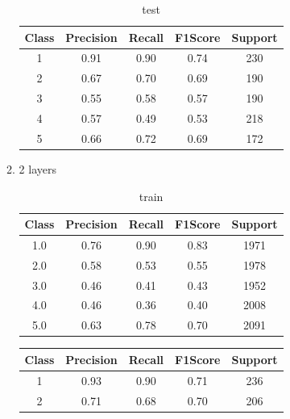 \begin{enumerate}[label=(\alph*)]
\begin{enumerate}[label=\roman*.]
\begin{table}[!htb]
            \label{part f train depth 1}
        \end{table}
        \begin{table}[!htb]
            \centering
            \begin{tabular}{ccccc}
            \hline
            Class & Precision & Recall & F1Score & Support \\ \hline
            1     & 0.91      & 0.90   & 0.74    & 230     \\
            2     & 0.67      & 0.70   & 0.69    & 190     \\
            3     & 0.55      & 0.58   & 0.57    & 190     \\
            4     & 0.57      & 0.49   & 0.53    & 218     \\
            5     & 0.66      & 0.72   & 0.69    & 172     \\ \hline
            \end{tabular}
            \caption{test}
            \label{part f test depth 1}
        \end{table}
        \newpage
        \item 2 layers
        \begin{table}[!htb]
            \centering
            \begin{tabular}{ccccc}
            \hline
            Class & Precision & Recall & F1Score & Support \\ \hline
            1.0   & 0.76      & 0.90   & 0.83    & 1971    \\
            2.0   & 0.58      & 0.53   & 0.55    & 1978    \\
            3.0   & 0.46      & 0.41   & 0.43    & 1952    \\
            4.0   & 0.46      & 0.36   & 0.40    & 2008    \\
            5.0   & 0.63      & 0.78   & 0.70    & 2091    \\ \hline
            \end{tabular}
            \caption{train}
            \label{part f train depth 2}
        \end{table}
        \begin{table}[!htb]
            \centering
            \begin{tabular}{ccccc}
            \hline
            Class & Precision & Recall & F1Score & Support \\ \hline
            1     & 0.93      & 0.90   & 0.71    & 236     \\
            2     & 0.71      & 0.68   & 0.70    & 206     \\

\end{tabular}
\end{table}
\end{enumerate}
\end{enumerate}
